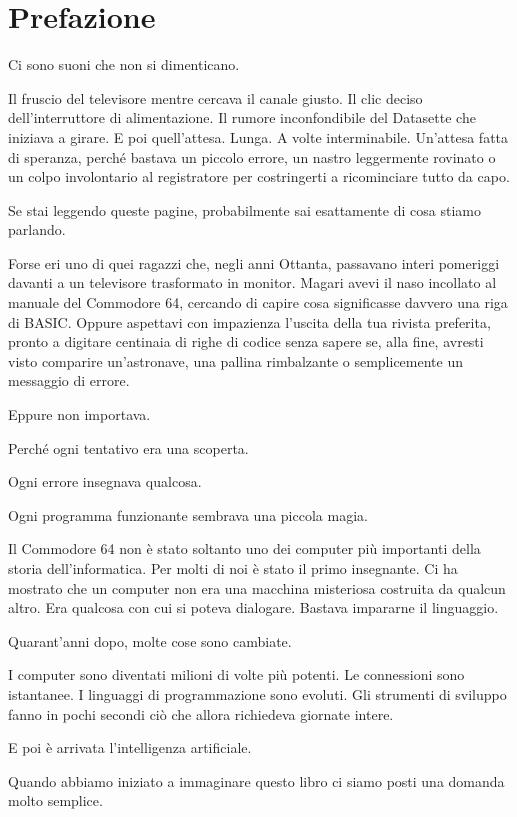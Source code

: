 \documentclass{article}
\author{HP}
\date{2026-07-26}
\begin{document}
\section{Prefazione}
Ci sono suoni che non si dimenticano.

Il fruscio del televisore mentre cercava il canale giusto. Il clic deciso dell'interruttore di alimentazione. Il rumore
inconfondibile del Datasette che iniziava a girare. E poi quell'attesa. Lunga. A volte interminabile. Un'attesa fatta
di speranza, perché bastava un piccolo errore, un nastro leggermente rovinato o un colpo involontario al registratore
per costringerti a ricominciare tutto da capo.

Se stai leggendo queste pagine, probabilmente sai esattamente di cosa stiamo parlando.

Forse eri uno di quei ragazzi che, negli anni Ottanta, passavano interi pomeriggi davanti a un televisore trasformato in
monitor. Magari avevi il naso incollato al manuale del Commodore 64, cercando di capire cosa significasse davvero una
riga di BASIC. Oppure aspettavi con impazienza l'uscita della tua rivista preferita, pronto a digitare centinaia di
righe di codice senza sapere se, alla fine, avresti visto comparire un'astronave, una pallina rimbalzante o
semplicemente un messaggio di errore.

Eppure non importava.

Perché ogni tentativo era una scoperta.

Ogni errore insegnava qualcosa.

Ogni programma funzionante sembrava una piccola magia.

Il Commodore 64 non è stato soltanto uno dei computer più importanti della storia dell'informatica. Per molti di noi è
stato il primo insegnante. Ci ha mostrato che un computer non era una macchina misteriosa costruita da qualcun altro.
Era qualcosa con cui si poteva dialogare. Bastava impararne il linguaggio.

Quarant'anni dopo, molte cose sono cambiate.

I computer sono diventati milioni di volte più potenti. Le connessioni sono istantanee. I linguaggi di programmazione
sono evoluti. Gli strumenti di sviluppo fanno in pochi secondi ciò che allora richiedeva giornate intere.

E poi è arrivata l'intelligenza artificiale.

Quando abbiamo iniziato a immaginare questo libro ci siamo posti una domanda molto semplice.
\end{document}
